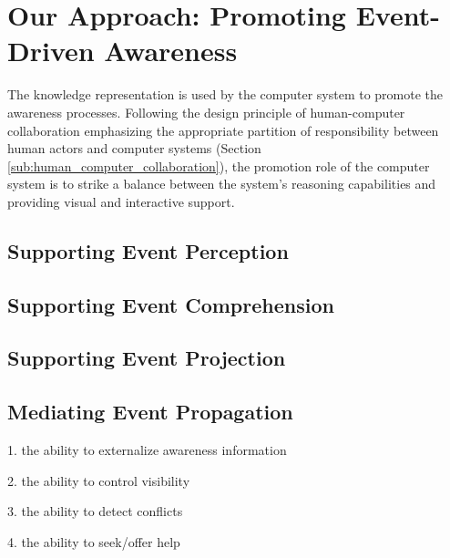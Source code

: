 \graphicspath{{Figures/}}

\chapter{Our Approach: Promoting Event-Driven Awareness} %
\label{cha:promoting_event_driven_awareness}
The knowledge representation is used by the computer system to promote the awareness processes. Following the design principle of human-computer collaboration emphasizing the appropriate partition of responsibility between human actors and computer systems (Section \ref{sub:human_computer_collaboration}), the promotion role of the computer system is to strike a balance between the system's reasoning capabilities and providing visual and interactive support.

\section{Supporting Event Perception} %
\label{sec:supporting_event_perception}


\section{Supporting Event Comprehension} %
\label{sec:supporting_event_comprehension}


\section{Supporting Event Projection} %
\label{sec:supporting_event_projection}


\section{Mediating Event Propagation} %
\label{sec:mediating_event_propagation}
1. the ability to externalize awareness information

2. the ability to control visibility

3. the ability to detect conflicts

4. the ability to seek/offer help

